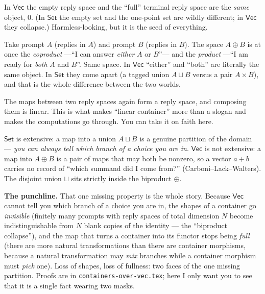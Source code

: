 \documentclass[11pt]{article}
\providecommand{\Vec}{}\renewcommand{\Vec}{\mathsf{Vec}}
\newcommand{\Set}{\mathsf{Set}}
\begin{document}
\begin{description}[leftmargin=1.2em,style=nextline]
\item[The zero object.] In $\Vec$ the empty reply space and the ``full'' terminal reply
  space are the \emph{same} object, $0$. (In $\Set$ the empty set and the one-point set are
  wildly different; in $\Vec$ they collapse.) Harmless-looking, but it is the seed of
  everything.
\item[The biproduct $A\oplus B$ --- the cleanest hook.] Take prompt $A$ (replies in $A$)
  and prompt $B$ (replies in $B$). The space $A\oplus B$ is at once the \emph{coproduct}
  ---``I can answer \emph{either} $A$ or $B$''--- and the \emph{product} ---``I am ready for
  \emph{both} $A$ and $B$''. Same space. In $\Vec$ ``either'' and ``both'' are literally the
  same object. In $\Set$ they come apart (a tagged union $A\sqcup B$ versus a pair
  $A\times B$), and that is the whole difference between the two worlds.
\item[Self-enrichment.] The maps between two reply spaces again form a reply space, and
  composing them is linear. This is what makes ``linear container'' more than a slogan and
  makes the computations go through. You can take it on faith here.
\item[What $\Vec$ \emph{lacks}: extensivity.] $\Set$ is extensive: a map into a union
  $A\sqcup B$ is a genuine partition of the domain --- \emph{you can always tell which
  branch of a choice you are in}. $\Vec$ is not extensive: a map into $A\oplus B$ is a pair
  of maps that may both be nonzero, so a vector $a+b$ carries no record of ``which summand
  did I come from?'' (Carboni--Lack--Walters). The disjoint union $\sqcup$ sits strictly
  inside the biproduct $\oplus$.
\end{description}

\textbf{The punchline.} That one missing property is the whole story. Because $\Vec$ cannot
tell you which branch of a choice you are in, the shapes of a container go \emph{invisible}
(finitely many prompts with reply spaces of total dimension $N$ become indistinguishable
from $N$ blank copies of the identity --- the ``biproduct collapse''), and the map that
turns a container into its functor stops being \emph{full} (there are more natural
transformations than there are container morphisms, because a natural transformation may
\emph{mix} branches while a container morphism must \emph{pick} one). Loss of shapes, loss
of fullness: two faces of the one missing partition. Proofs are in
\texttt{containers-over-vec.tex}; here I only want you to see that it is a single fact
wearing two masks.
\end{document}
